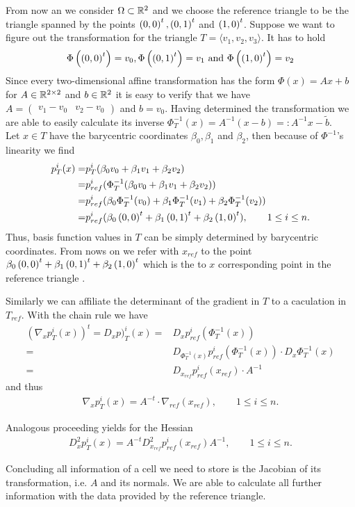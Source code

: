 \begin{example}
From now an we consider $\Omega \subset \mathbb{R}^2$ and we choose the reference triangle to be the triangle spanned by the points $\left( 0, 0\right)^t, \left( 0, 1\right)^t$ and $\left( 1, 0\right)^t$.
Suppose we want to figure out the transformation for the triangle $T = \langle v_1,v_2,v_3 \rangle$.
It has to hold
\[
\Phi\left(\left( 0, 0\right)^t\right) = v_0, \Phi\left(\left( 0, 1\right)^t\right) = v_1 \textnormal{ and } \Phi\left(\left( 1, 0\right)^t\right) = v_2
\]
Since every two-dimensional affine transformation has the form $\Phi(x) = Ax+b$ for $A \in \mathbb{R}^{2 \times 2}$ and $b \in \mathbb{R}^2$ it is easy to verify that we have $A = \begin{pmatrix} v_1-v_0 & v_2-v_0\end{pmatrix}$ and $b = v_0$.
Having determined the transformation we are able to easily calculate its inverse $\Phi_T^{-1}(x) = A^{-1} (x-b) =: A^{-1} x- \tilde b$. \\
Let $x \in T$ have the barycentric coordinates $\beta_0, \beta_1$ and $\beta_2$, then because of $\Phi^{-1}$'s linearity we find
\begin{align*}
	p^i_T(x) =& p_T^i( \beta_0 v_0 +\beta_1 v_1 + \beta_2 v_2  ) \\
	=& p^i_{ref}(\Phi_T^{-1}(\beta_0 v_0 +\beta_1 v_1 + \beta_2 v_2)) \\
	=& p^i_{ref}(\beta_0 \Phi_T^{-1}(v_0) +\beta_1 \Phi_T^{-1}(v_1) + \beta_2 \Phi_T^{-1}(v_2)) \\
		=& p^i_{ref}(\beta_0 \left( 0, 0\right)^t +\beta_1 \left( 0, 1\right)^t + \beta_2 \left( 1, 0\right)^t ), \qquad 1 \leq i \leq n.
\end{align*}
Thus, basis function values in $T$ can be simply determined by barycentric coordinates. From nows on we refer with $x_{ref}$  to the point $\beta_0 \left( 0, 0\right)^t +\beta_1 \left( 0, 1\right)^t + \beta_2 \left( 1, 0\right)^t$ which is the to $x$ corresponding point in the reference triangle .

Similarly we can affiliate the determinant of the gradient in $T$ to a caculation in $T_{ref}$. With the chain rule we have
\begin{align*}
	\left(\nabla_x p_T^i(x)\right)^t = D_x p)_T^i(x) =& D_x p^i_{ref}(\Phi_T^{-1}(x)) \\
	  =& D_{\Phi_T^{-1}(x)}p^i_{ref}(\Phi_T^{-1}(x)) \cdot D_x  \Phi_T^{-1}(x) \\
	  =& D_{x_{ref}}p^i_{ref}(x_{ref}) \cdot  A^{-1}
\end{align*}
and thus
\begin{align}
	\nabla_x p_T^i(x) = A^{-t} \cdot \nabla_{ref}(x_{ref}), \qquad 1 \leq i \leq n.
\end{align}

Analogous proceeding yields for the Hessian
\begin{align}
D_x^2p_T^i(x) = A^{-t} D_{x_{ref}}^2p^i_{ref}(x_{ref})  A^{-1}, \qquad 1 \leq i \leq n.
\end{align}

Concluding all information of a cell we need to store is the Jacobian of its transformation, i.e. $A$ and its normals. We are able to calculate all further information with the data provided by the reference triangle.
\end{example}

